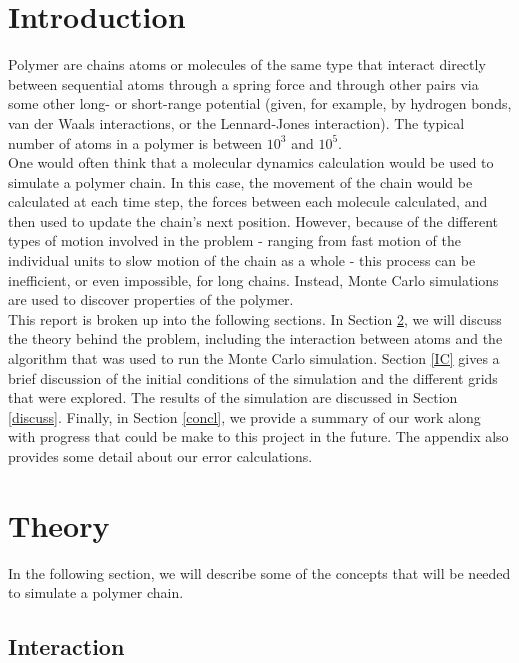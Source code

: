 \documentclass{article}
\begin{document}
\begin{multicols}{2}

\section{Introduction}

Polymer are chains atoms or molecules of the same type that interact directly between sequential atoms through a spring force and through other pairs via some other long- or short-range potential (given, for example, by hydrogen bonds, van der Waals interactions, or the Lennard-Jones interaction).  The typical number of atoms in a polymer is between $10^3$ and $10^5$.  \\

One would often think that a molecular dynamics calculation would be used to simulate a polymer chain.  In this case, the movement of the chain would be calculated at each time step, the forces between each molecule calculated, and then used to update the chain's next position.  However, because of the different types of motion involved in the problem - ranging from fast motion of the individual units to slow motion of the chain as a whole - this process can be inefficient, or even impossible, for long chains.  \cite{PhilNotes} Instead, Monte Carlo simulations are used to discover properties of the polymer.  \\

This report is broken up into the following sections.  In Section \ref{theory}, we will discuss the theory behind the problem, including the interaction between atoms and the algorithm that was used to run the Monte Carlo simulation.  Section \ref{IC} gives a brief discussion of the initial conditions of the simulation and the different grids that were explored.  The results of the simulation are discussed in Section \ref{discuss}.  Finally, in Section \ref{concl}, we provide a summary of our work along with progress that could be make to this project in the future.  The appendix also provides some detail about our error calculations.  \\

\section{Theory}
\label{theory}

In the following section, we will describe some of the concepts that will be needed to simulate a polymer chain.

\subsection{Interaction}


\end{multicols}
\end{document}
